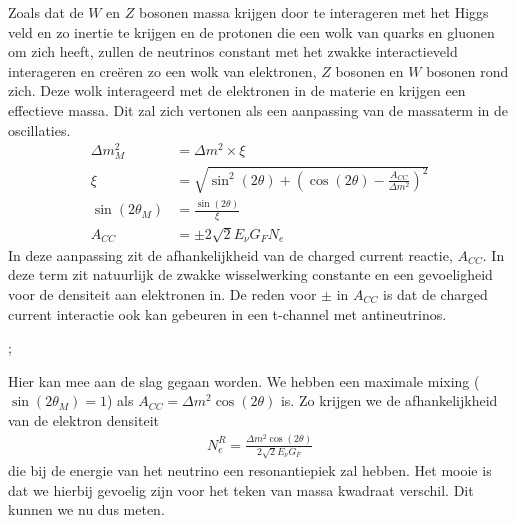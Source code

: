 \documentclass[../main.tex]{subfiles}
\begin{document}
Zoals dat de $W$ en $Z$ bosonen massa krijgen door te interageren met het Higgs veld en zo inertie te krijgen en de protonen die een wolk van quarks en gluonen om zich heeft, zullen de neutrinos constant met het zwakke interactieveld interageren en creëren zo een wolk van elektronen, $Z$ bosonen en $W$ bosonen rond zich. Deze wolk interageerd met de elektronen in de materie en krijgen een effectieve massa. Dit zal zich vertonen als een aanpassing van de massaterm in de oscillaties.
\begin{equation}
    \begin{aligned}
        \label{eq:msw_effect}
        \Delta m_{M}^{2}&=\Delta m^{2} \times \xi\\
        \xi&=\sqrt{\sin ^{2}(2 \theta)+\left(\cos (2 \theta)-\frac{A_{C C}}{\Delta m^{2}}\right)^{2}}\\
        \sin \left(2 \theta_{M}\right)&=\frac{\sin (2 \theta)}{\xi}\\
        A_{C C}&=\pm 2 \sqrt{2} E_{\nu} G_{F} N_{e}
    \end{aligned}
\end{equation}
In deze aanpassing zit de afhankelijkheid van de charged current reactie, $A_{CC}$. In deze term zit natuurlijk de zwakke wisselwerking constante en een gevoeligheid voor de densiteit aan elektronen in. De reden voor $\pm$ in $A_{CC}$ is dat de charged current interactie ook kan gebeuren in een t-channel met antineutrinos.\\
\begin{center}
    ;
\end{center}
Hier kan mee aan de slag gegaan worden. We hebben een maximale mixing ($\sin \left(2 \theta_{M}\right)=1$) als $A_{C C}=\Delta m^{2} \cos (2 \theta)$ is. Zo krijgen we de afhankelijkheid van de elektron densiteit
\begin{equation}
    \begin{aligned}
        \label{eq:msw_elektron_densiteit}
        N_{e}^{R}=\frac{\Delta m^{2} \cos (2 \theta)}{2 \sqrt{2} E_{\nu} G_{F}}
    \end{aligned}
\end{equation}
die bij de energie van het neutrino een resonantiepiek zal hebben. Het mooie is dat we hierbij gevoelig zijn voor het teken van massa kwadraat verschil. Dit kunnen we nu dus meten.
\end{document}
